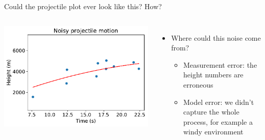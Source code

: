 \documentclass[aspectratio=169]{beamer}
\begin{document}
\begin{frame}{Could the projectile plot ever look like this?  How?}

\begin{columns}

\includegraphics[scale=0.5]{data/Huang_et_al/projectile_noise.pdf}


\pause

\begin{itemize}
\item Where could this noise come from?
\begin{itemize}
\item Measurement error: the height numbers are erroneous
\item Model error: we didn't capture the whole process, for example a windy environment
\end{itemize}
\end{itemize}
\end{columns}

\end{frame}
\end{document}
